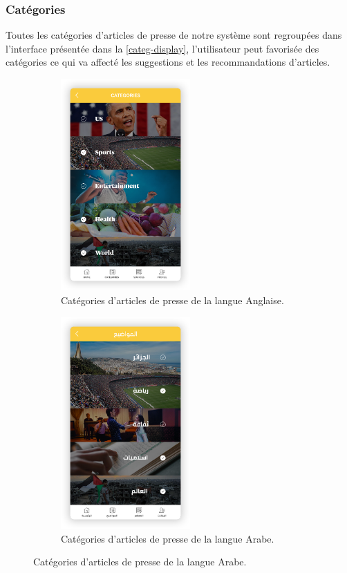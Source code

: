     \subsubsection{Catégories}
    Toutes les catégories d'articles de presse de notre système sont regroupées dans l'interface présentée dans la \autoref{categ-display}, l'utilisateur peut favorisée des catégories ce qui va affecté les suggestions et les recommandations d'articles. 
        \begin{figure}[H]
           \begin{minipage}{0.48\textwidth}
             \begin{figure}[H]
                \centering
                \includegraphics[width=140pt]{img/chapter4/feedny/en-categ.png}
                \caption{Catégories d'articles de presse de la langue Anglaise.}
            \end{figure}
           \end{minipage}\hfill
           \begin {minipage}{0.48\textwidth}
             \begin{figure}[H]
                \centering
                \includegraphics[width=140pt]{img/chapter4/feedny/ar-categ.png}
                \caption{Catégories d'articles de presse de la langue Arabe.}
            \end{figure}
           \end{minipage}
           \label{categ-display}
        \end{figure}


